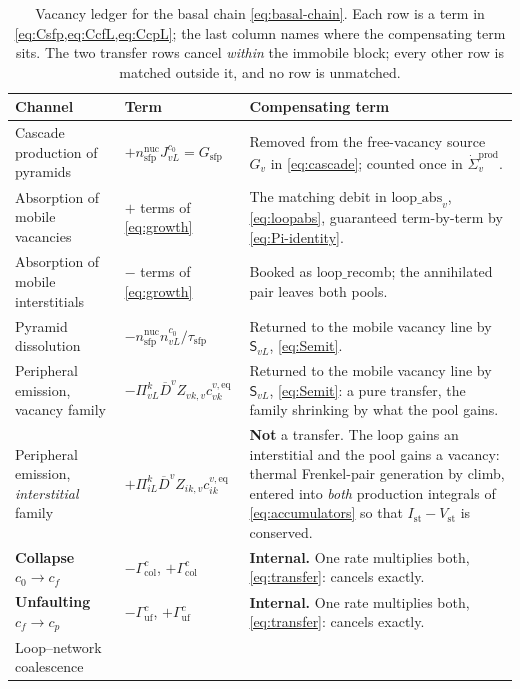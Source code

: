 \documentclass{article}
\newcommand{\spvec}[1]{\bm{\mathsf{#1}}}   %
\begin{document}
\begin{table}[htbp]
\centering
\small
\caption{Vacancy ledger for the basal chain \cref{eq:basal-chain}. Each row is a
term in \cref{eq:Csfp,eq:CcfL,eq:CcpL}; the last column names where the
compensating term sits. The two transfer rows cancel \emph{within} the immobile
block; every other row is matched outside it, and no row is unmatched.}
\label{tab:basal-ledger}
\begin{tabularx}{\textwidth}{@{}l l X@{}}
\toprule
Channel & Term & Compensating term \\
\midrule
Cascade production of pyramids &
$+n^{\mathrm{nuc}}_{\mathrm{sfp}}J^{c_0}_{vL}=G_{\mathrm{sfp}}$ &
Removed from the free-vacancy source $G_v$ in \cref{eq:cascade}; counted once in
$\dot\Sigma^{\mathrm{prod}}_v$. \\
Absorption of mobile vacancies &
$+$ terms of \cref{eq:growth} &
The matching debit in $\mathrm{loop\_abs}_v$, \cref{eq:loopabs}, guaranteed
term-by-term by \cref{eq:Pi-identity}. \\
Absorption of mobile interstitials &
$-$ terms of \cref{eq:growth} &
Booked as $\mathrm{loop\_recomb}$; the annihilated pair leaves both pools. \\
Pyramid dissolution &
$-n^{\mathrm{nuc}}_{\mathrm{sfp}}n^{c_0}_{vL}/\tau_{\mathrm{sfp}}$ &
Returned to the mobile vacancy line by $\spvec S_{vL}$, \cref{eq:Semit}. \\
Peripheral emission, vacancy family &
$-\Pi^{k}_{vL}\overline D^{v}Z_{vk,v}c^{v,\mathrm{eq}}_{vk}$ &
Returned to the mobile vacancy line by $\spvec S_{vL}$, \cref{eq:Semit}: a pure
transfer, the family shrinking by what the pool gains. \\
Peripheral emission, \emph{interstitial} family &
$+\Pi^{k}_{iL}\overline D^{v}Z_{ik,v}c^{v,\mathrm{eq}}_{ik}$ &
\textbf{Not} a transfer. The loop gains an interstitial and the pool gains a
vacancy: thermal Frenkel-pair generation by climb, entered into
\emph{both} production integrals of \cref{eq:accumulators} so that
$I_{\mathrm{st}}-V_{\mathrm{st}}$ is conserved. \\
\textbf{Collapse} $c_0\to c_f$ &
$-\Gamma^{c}_{\mathrm{col}}$, $+\Gamma^{c}_{\mathrm{col}}$ &
\textbf{Internal.} One rate multiplies both, \cref{eq:transfer}: cancels exactly.
\\
\textbf{Unfaulting} $c_f\to c_p$ &
$-\Gamma^{c}_{\mathrm{uf}}$, $+\Gamma^{c}_{\mathrm{uf}}$ &
\textbf{Internal.} One rate multiplies both, \cref{eq:transfer}: cancels exactly.
\\
Loop--network coalescence &

\end{tabularx}
\end{table}
\end{document}
